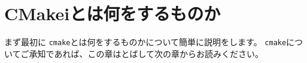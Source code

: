 \newpage
\section{CMakeiとは何をするものか}
\label{sec:WhatCMakeWillDo}

\def\Anno#1{\mc{\footnotesize{ \CDots\  #1}}}
\def\SolutionFile{\hbox{ソリューションファイル
	{\raise 1.2ex\hbox{\scriptsize (}}%
	\raise.3ex\hbox{\small{$^\dagger$}}%
	{\raise 1.2ex\hbox{\scriptsize )}}%
}}
\def\ProjectFile{\hbox{プロジェクトファイル
	{\raise 1.2ex\hbox{\scriptsize (}}%
	\raise.4ex\hbox{\small{$^\ddagger$}}%
	{\raise 1.2ex\hbox{\scriptsize )}}%
}}
\def\cmake{{\tt{cmake}}}
\def\build{{\it{build\/}}}

\noindent
まず最初に \cmake とは何をするものかについて簡単に説明をします。
\cmake についてご承知であれば、この章はとばして次の章からお読みください。

